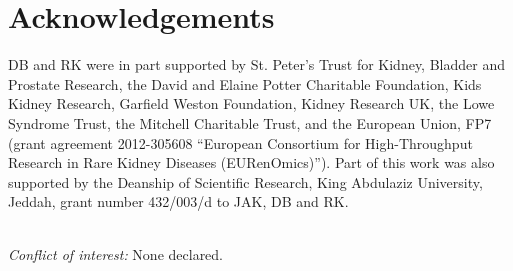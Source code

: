 
\vspace{-0.3cm}
\section*{Acknowledgements}

DB and RK were in part supported by St. Peter's Trust for Kidney, Bladder and Prostate Research, the David and Elaine Potter Charitable Foundation, Kids Kidney Research, Garfield Weston Foundation, Kidney Research UK, the Lowe Syndrome Trust, the Mitchell Charitable Trust, and the European Union, FP7 (grant agreement 2012-305608 ``European Consortium for High-Throughput Research in Rare Kidney Diseases (EURenOmics)''). Part of this work was also supported by the Deanship of Scientific Research, King Abdulaziz University, Jeddah, grant number 432/003/d to JAK, DB and RK.\\\

\noindent
\textit{Conflict of interest:} None declared.



